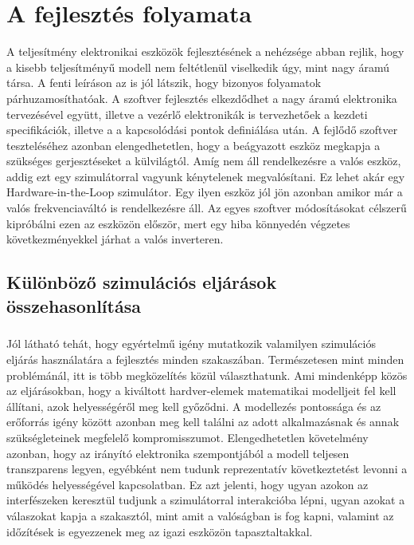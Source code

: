 \chapter{A fejlesztés folyamata}

A teljesítmény elektronikai eszközök fejlesztésének a nehézsége abban rejlik, hogy a kisebb teljesítményű modell nem feltétlenül viselkedik úgy, mint nagy áramú társa. A fenti leíráson az is jól látszik, hogy bizonyos folyamatok párhuzamosíthatóak. A szoftver fejlesztés elkezdődhet a nagy áramú elektronika tervezésével együtt, illetve a vezérlő elektronikák is tervezhetőek a kezdeti specifikációk, illetve a a kapcsolódási pontok definiálása után. A fejlődő szoftver teszteléséhez azonban elengedhetetlen, hogy a beágyazott eszköz megkapja a szükséges gerjesztéseket a külvilágtól. Amíg nem áll rendelkezésre a valós eszköz, addig ezt egy szimulátorral vagyunk kénytelenek megvalósítani. Ez lehet akár egy Hardware-in-the-Loop szimulátor. Egy ilyen eszköz jól jön azonban amikor már a valós frekvenciaváltó is rendelkezésre áll. Az egyes szoftver módosításokat célszerű kipróbálni ezen az eszközön először, mert egy hiba könnyedén végzetes következményekkel járhat a valós inverteren.  \cite{sutozoli}

\section{Különböző szimulációs eljárások összehasonlítása}

\paragraph{}
Jól látható tehát, hogy egyértelmű igény mutatkozik valamilyen szimulációs eljárás használatára a fejlesztés minden szakaszában. Természetesen mint minden problémánál, itt is több megközelítés közül választhatunk. Ami mindenképp közös az eljárásokban, hogy a kiváltott hardver-elemek matematikai modelljeit fel kell állítani, azok helyességéről meg kell győződni. A modellezés pontossága és az erőforrás igény között azonban meg kell találni az adott alkalmazásnak és annak szükségleteinek megfelelő kompromisszumot. Elengedhetetlen követelmény azonban, hogy az irányító elektronika szempontjából a modell teljesen transzparens legyen, egyébként nem tudunk reprezentatív következtetést levonni a működés helyességével kapcsolatban. Ez azt jelenti, hogy ugyan azokon az interfészeken keresztül tudjunk a szimulátorral interakcióba lépni, ugyan azokat a válaszokat kapja a szakasztól, mint amit a valóságban is fog kapni, valamint az időzítések is egyezzenek meg az igazi eszközön tapasztaltakkal.

